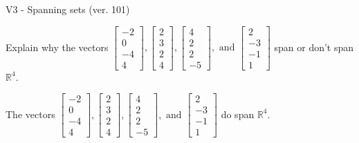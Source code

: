 \begin{exercise}
  \begin{exerciseTitle}V3 - Spanning sets (ver. 101)\end{exerciseTitle}
  \begin{exerciseStatement}
    Explain why the vectors \(\left[\begin{array}{r}
-2 \\
0 \\
-4 \\
4
\end{array}\right] , \left[\begin{array}{r}
2 \\
3 \\
2 \\
4
\end{array}\right] , \left[\begin{array}{r}
4 \\
2 \\
2 \\
-5
\end{array}\right] , \text{ and } \left[\begin{array}{r}
2 \\
-3 \\
-1 \\
1
\end{array}\right]\) span or don't span \(\mathbb{R}^4\). 
	


  \end{exerciseStatement}
  \begin{exerciseAnswer}
   The vectors \(\left[\begin{array}{r}
-2 \\
0 \\
-4 \\
4
\end{array}\right] , \left[\begin{array}{r}
2 \\
3 \\
2 \\
4
\end{array}\right] , \left[\begin{array}{r}
4 \\
2 \\
2 \\
-5
\end{array}\right] , \text{ and } \left[\begin{array}{r}
2 \\
-3 \\
-1 \\
1
\end{array}\right]\) 
  	 do  
	span \(\mathbb{R}^4\).
  


  \end{exerciseAnswer}
\end{exercise}